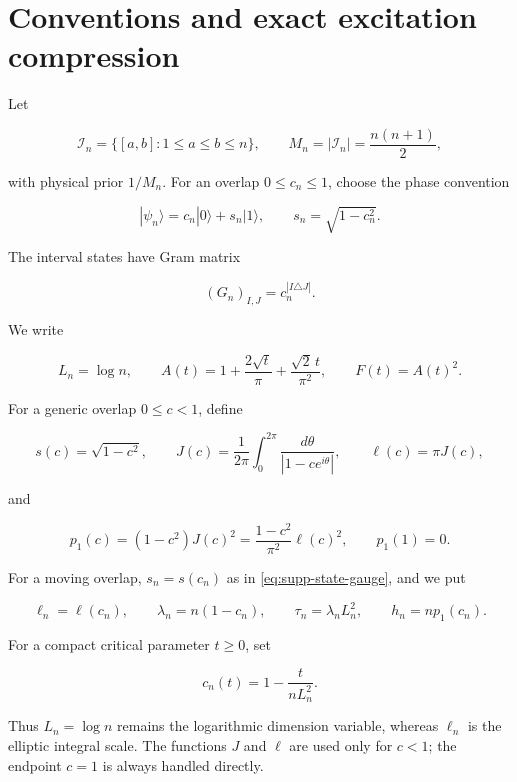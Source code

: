 \section{Conventions and exact excitation compression}
\label{supp:conventions}

Let

\begin{equation}\label{eq:supp-labels}
 \mathcal I_n=\{[a,b]:1\le a\le b\le n\},
 \qquad M_n=|\mathcal I_n|=\frac{n(n+1)}2,
\end{equation}

with physical prior \(1/M_n\).  For an overlap \(0\le c_n\le1\), choose
the phase convention

\begin{equation}\label{eq:supp-state-gauge}
 |\psi_n\rangle=c_n|0\rangle+s_n|1\rangle,
 \qquad s_n=\sqrt{1-c_n^2}.
\end{equation}

The interval states have Gram matrix

\begin{equation}\label{eq:supp-physical-gram}
 (G_n)_{I,J}=c_n^{|I\triangle J|}.
\end{equation}

We write

\begin{equation}\label{eq:supp-critical-functions}
 L_n=\log n,
 \qquad
 A(t)=1+\frac{2\sqrt t}{\pi}+\frac{\sqrt2\,t}{\pi^2},
 \qquad F(t)=A(t)^2.
\end{equation}

For a generic overlap \(0\le c<1\), define

\[
 s(c)=\sqrt{1-c^2},\qquad
 J(c)=\frac1{2\pi}\int_0^{2\pi}
 \frac{d\theta}{|1-ce^{i\theta}|},\qquad
 \ell(c)=\pi J(c),
\]

and

\[
 p_1(c)=(1-c^2)J(c)^2
 =\frac{1-c^2}{\pi^2}\ell(c)^2,
 \qquad p_1(1)=0.
\]

For a moving overlap, \(s_n=s(c_n)\) as in
\eqref{eq:supp-state-gauge}, and we put

\[
 \ell_n=\ell(c_n),\qquad
 \lambda_n=n(1-c_n),\qquad
 \tau_n=\lambda_nL_n^2,\qquad
 h_n=np_1(c_n).
\]

For a compact critical parameter \(t\ge0\), set

\begin{equation}\label{eq:supp-critical-family-definition}
 c_n(t)=1-\frac{t}{nL_n^2}.
\end{equation}

Thus \(L_n=\log n\) remains the logarithmic dimension variable, whereas
\(\ell_n\) is the elliptic integral scale.  The functions \(J\) and
\(\ell\) are used only for \(c<1\); the endpoint \(c=1\) is always handled
directly.

